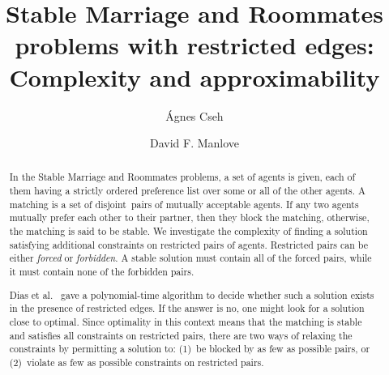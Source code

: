 \documentclass[preprint,12pt]{elsarticle}
\begin{document}
\begin{frontmatter}

\title{Stable Marriage and Roommates problems with restricted edges: Complexity and approximability}


\author[cseh]{\'Agnes Cseh}

\author[manlove]{David F. Manlove}

\address[cseh]{Institute for Mathematics, Technische Universit\"at Berlin, Sekr. MA 5-2, Stra{\ss}e des 17. Juni 136, 10623 Berlin, Germany}

\address[manlove]{School of Computing Science, Sir Alwyn Williams Building, University of Glasgow, Glasgow G12 8QQ, UK}

\begin{abstract}
In the Stable Marriage and Roommates problems, a set of agents is given, each of them having a strictly ordered preference list over some or all of the other agents. A matching is a set of disjoint~pairs of mutually acceptable agents. If any two agents mutually prefer each other to their partner, then they block the matching, otherwise, the matching is said to be stable. We investigate the complexity of finding a solution satisfying additional constraints on restricted pairs of agents. Restricted pairs can be either \emph{forced} or \emph{forbidden}. A stable solution must contain all of the forced pairs, while it must contain none of the forbidden pairs.

Dias et al.~\cite{DFFS03} gave a polynomial-time algorithm  to decide whether such a solution exists in the presence of restricted edges. If the answer is no, one might look for a solution close to optimal. Since optimality in this context means that the matching is stable and satisfies all constraints on restricted pairs, there are two ways of relaxing the constraints by permitting a solution to: (1)~be blocked by as few as possible pairs, or (2)~violate as few as possible constraints on restricted pairs.


\end{abstract}
\end{frontmatter}
\end{document}

